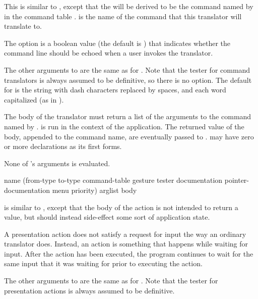 This is similar to , except that the
 will be derived to be the command named by  in
the command table .   is the name of the
command that this translator will translate to.

The  option is a boolean value (the default is ) that
indicates whether the command line should be echoed when a user invokes the
translator.

The other arguments to  are the
same as for .  Note that the tester for
command translators is always assumed to be definitive, so there is no
 option. The default for  is
the string  with dash characters replaced by spaces, and each
word capitalized (as in ).

The body of the translator must return a list of the arguments to the command
named by .   is run in the context of the
application.  The returned value of the body, appended to the command name, are
eventually passed to .   may have zero or
more declarations as its first forms.

None of 's arguments is evaluated.


 {name 
                                        (from-type to-type command-table 
                                         \key gesture tester
                                              documentation pointer-documentation
                                              menu priority)
                                        arglist
                                        \body body}

 is similar to ,
except that the body of the action is not intended to return a value, but should
instead side-effect some sort of application state.

A presentation action does not satisfy a request for input the way an ordinary
translator does.  Instead, an action is something that happens while waiting for
input.  After the action has been executed, the program continues to wait for
the same input that it was waiting for prior to executing the action.

The other arguments to  are the same as for
.  Note that the tester for presentation
actions is always assumed to be definitive.

